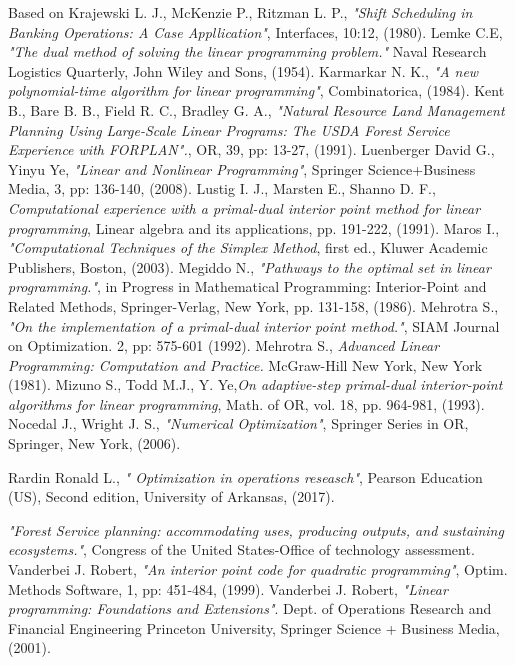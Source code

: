 \documentclass[a4paper,10 pt,titlepage,twoside]{book}
\theoremstyle{plain}
\theoremstyle{definition}
\theoremstyle{remark}
\begin{document}
\begin{thebibliography}{9}
		Based on Krajewski L. J., McKenzie P., Ritzman L. P., \textit{ "Shift Scheduling in Banking Operations: A Case Appllication"}, Interfaces, 10:12, (1980).
		 Lemke C.E, \textit{ "The dual method of solving the linear programming problem."} Naval Research Logistics Quarterly, John Wiley and Sons, (1954).
		 Karmarkar N. K.,\emph{ "A new polynomial-time algorithm for linear programming"}, Combinatorica, (1984).
		 Kent B., Bare B. B., Field R. C., Bradley G. A., \textit{"Natural Resource Land Management Planning Using Large-Scale Linear Programs: The USDA Forest Service Experience with FORPLAN".}, OR, 39, pp: 13-27, (1991).
		Luenberger David G., Yinyu Ye, \emph{"Linear and Nonlinear Programming"}, Springer Science+Business Media, 3, pp: 136-140, (2008).
		 Lustig I. J., Marsten E., Shanno D. F., \emph{ Computational experience with a primal-dual interior point method for linear programming}, Linear algebra and its applications, pp. 191-222, (1991).
		 Maros I., \emph{ "Computational Techniques of the Simplex Method}, first ed., Kluwer
		Academic Publishers, Boston, (2003).
		 Megiddo N., \emph{ "Pathways to the optimal set in linear programming."}, in Progress in Mathematical Programming: Interior-Point and Related Methods, Springer-Verlag, New York, pp. 131-158, (1986).
	 Mehrotra S., \emph{ "On the implementation of a primal-dual interior point method."}, SIAM Journal on Optimization. 2, pp: 575-601 (1992).
	 Mehrotra S., \emph{ Advanced Linear Programming: Computation and
	Practice. } McGraw-Hill New York, New York (1981).
		Mizuno S., Todd M.J., Y. Ye,\emph{\;On adaptive-step primal-dual interior-point algorithms for linear programming}, Math. of OR, vol. 18, pp. 964-981, (1993). 
	Nocedal J., Wright J. S., \emph{\;"Numerical Optimization"}, Springer Series in OR, Springer, New York, (2006).


 Rardin Ronald L., \textit{" Optimization in operations reseasch"}, Pearson Education (US), Second edition, University of Arkansas, (2017).

 \emph{"Forest Service planning: accommodating uses, producing outputs, and sustaining ecosystems."}, Congress of the United States-Office of technology assessment.
 Vanderbei J. Robert, \emph{\;"An interior point code for quadratic programming"}, Optim. Methods Software, 1, pp: 451-484, (1999). 
 Vanderbei J. Robert, \emph{\;"Linear programming:
Foundations and Extensions"}. Dept. of Operations Research and Financial Engineering
Princeton University, Springer Science + Business Media, (2001).


\end{thebibliography}
\end{document}
